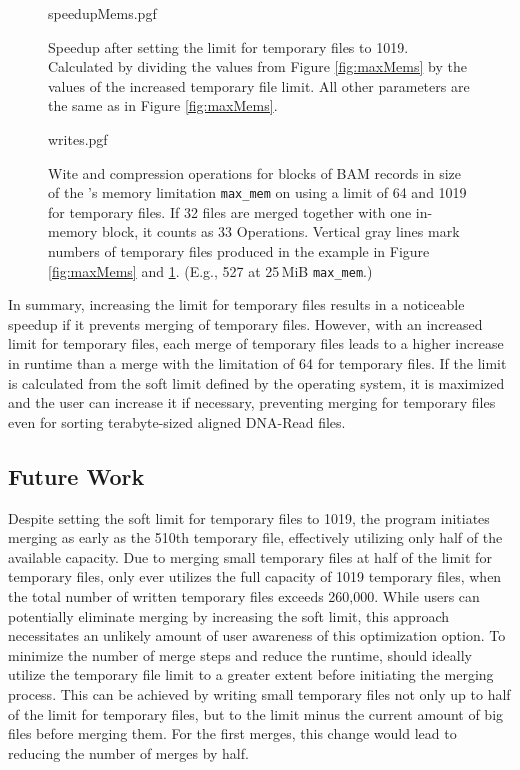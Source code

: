 \begin{figure}
        {speedupMems.pgf}
    \caption{Speedup after setting the limit for temporary files to 1019. Calculated by dividing the values from Figure \ref{fig:maxMems} by the values of the increased temporary file limit. All other parameters are the same as in Figure \ref{fig:maxMems}.}
    \label{fig:memSpeedup}
\end{figure}

\begin{figure}
        {writes.pgf}
    \caption{
    Wite and compression operations for blocks of BAM records in size of the \sort's memory limitation \texttt{max\_mem} on using a limit of 64 and 1019 for temporary files. If 32 files are merged together with one in-memory block, it counts as 33 Operations. Vertical gray lines mark numbers of temporary files produced in the example in Figure \ref{fig:maxMems} and \ref{fig:memSpeedup}. (E.g., 527 at 25\,MiB \texttt{max\_mem}.)
    }
    \label{fig:writes}
\end{figure}

In summary, increasing the limit for temporary files results in a noticeable speedup if it prevents merging of temporary files. However, with an increased limit for temporary files, each merge of temporary files leads to a higher increase in runtime than a merge with the limitation of 64 for temporary files. If the limit is calculated from the soft limit defined by the operating system, it is maximized and the user can increase it if necessary, preventing merging for temporary files even for sorting terabyte-sized aligned DNA-Read files. 

\subsection{Future Work}
Despite setting the soft limit for temporary files to 1019, the program initiates merging as early as the 510th temporary file, effectively utilizing only half of the available capacity. Due to merging small temporary files at half of the limit for temporary files, \sort only ever utilizes the full capacity of 1019 temporary files, when the total number of written temporary files exceeds 260,000. While users can potentially eliminate merging by increasing the soft limit, this approach necessitates an unlikely amount of user awareness of this optimization option. To minimize the number of merge steps and reduce the runtime, \sort should ideally utilize the temporary file limit to a greater extent before initiating the merging process. This can be achieved by writing small temporary files not only up to half of the limit for temporary files, but to the limit minus the current amount of big files before merging them. For the first merges, this change would lead to reducing the number of merges by half.